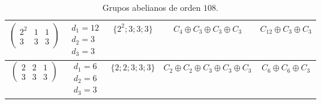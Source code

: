\begin{ejercicio}
\begin{enumerate}
\begin{table}[h]
\begin{tabular}{c|c|c|c|c}
                $\begin{pmatrix}
                    2^2 & 1 & 1\\
                    3 & 3 & 3
                \end{pmatrix}
                $ & $\begin{array}{l}
                    d_1=12 \\
                    d_2=3 \\
                    d_3=3
                \end{array}$ & $\{2^2; 3; 3; 3\}$ & $C_4 \oplus C_3 \oplus C_3 \oplus C_3$ & $C_{12} \oplus C_3 \oplus C_3$ \\ \hline
                $\begin{pmatrix}
                    2 & 2 & 1\\
                    3 & 3 & 3
                \end{pmatrix}
                $ & $\begin{array}{l}
                    d_1=6 \\
                    d_2=6 \\
                    d_3=3
                \end{array}$ & $\{2; 2; 3; 3; 3\}$ & $C_2 \oplus C_2 \oplus C_3 \oplus C_3 \oplus C_3$ & $C_6 \oplus C_6 \oplus C_3$
            \end{tabular}
            \caption{Grupos abelianos de orden $108$.}
            \label{tab:grupos_abelianos_108}
        \end{table}


\end{enumerate}
\end{ejercicio}
